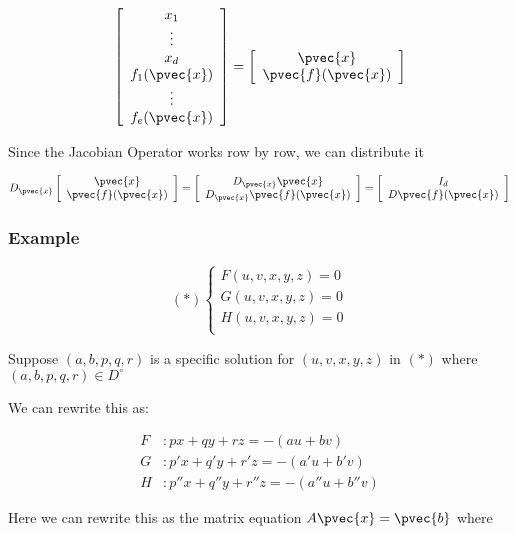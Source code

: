 \documentclass[11 pt, twoside]{article}
\begin{document}
$$\left[\begin{array}{c}
x_1 \\
\vdots \\
x_d \\
f_1 (\pvec{x})\\
\vdots \\
f_e (\pvec{x})
\end{array}\right] =
\left[\begin{array}{c}
\pvec{x}\\
\pvec{f}(\pvec{x})
\end{array}\right]$$

Since the Jacobian Operator works row by row, we can distribute it

$$D_{\pvec{x}} \left[\begin{array}{c}
\pvec{x}\\
\pvec{f}(\pvec{x})
\end{array}\right] =
\left[\begin{array}{c}
D_{\pvec{x}} \pvec{x} \\
D_{\pvec{x}} \pvec{f}(\pvec{x})
\end{array}\right] =
\left[\begin{array}{c}
I_d \\
D \pvec{f}(\pvec{x})
\end{array}\right]$$
\subsubsection{Example}
\[(*)
\begin{cases}
F(u, v, x, y, z) = 0 \\
G(u, v, x, y, z) = 0 \\
H(u, v, x, y, z) = 0 \\
\end{cases}
\]

Suppose $(a, b, p, q, r)$ is a specific solution for $(u, v, x, y, z)$ in $(*)$
where $(a, b, p, q, r) \in D^\circ$

We can rewrite this as:

\begin{align*}
F&: px + qy + rz = -(au + bv) \\
G&: p'x + q'y + r'z = -(a'u + b'v) \\
H&: p''x + q''y + r''z = -(a''u + b''v)
\end{align*}

Here we can rewrite this as the matrix equation $A\pvec{x} = \pvec{b}$ where
\end{document}
